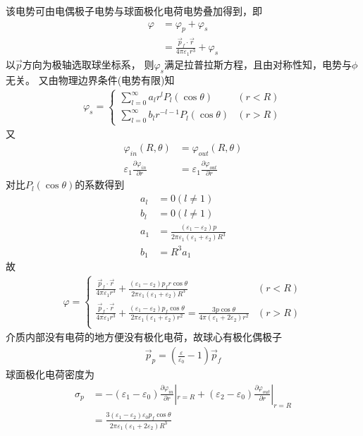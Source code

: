 \documentclass{phyasgn}
\begin{document}
\begin{sol}[3]
  该电势可由电偶极子电势与球面极化电荷电势叠加得到，即
  \begin{align*}
    \varphi&=\varphi_p+\varphi_s\\
    &=\frac{\vec{p}_f\cdot\vec{r}}{4\pi\varepsilon_1r^3}+\varphi_s
  \end{align*}
  以$\vec{p}$方向为极轴选取球坐标系，
  则$\varphi_s$满足拉普拉斯方程，且由对称性知，电势与$\phi$无关。
  又由物理边界条件(电势有限)知
  \begin{align*}
    \varphi_s=\left\{\begin{matrix}
      \sum_{l=0}^{\infty}a_lr^lP_l(\cos\theta)&(r<R)\\
      \sum_{l=0}^{\infty}b_lr^{-l-1}P_l(\cos\theta)&(r>R)
    \end{matrix}\right.
  \end{align*}
  又
  \begin{align*}
    \varphi_{in}(R,\theta)&=\varphi_{out}(R,\theta)\\
    \varepsilon_1\frac{\partial \varphi_{in}}{\partial r}&=\varepsilon_1\frac{\partial \varphi_{out}}{\partial r}
  \end{align*}
  对比$P_l(\cos\theta)$的系数得到
  \begin{align*}
    a_l&=0(l\neq1)\\
    b_l&=0(l\neq1)\\
    a_1&=\frac{(\varepsilon_1-\varepsilon_2)p}{2\pi\varepsilon_1(\varepsilon_1+\varepsilon_2)R^3}\\
    b_1&=R^3a_1
  \end{align*}
  故
  \begin{align*}
    \varphi=\left\{\begin{matrix}
      \frac{\vec{p}_f\cdot\vec{r}}{4\pi\varepsilon_1r^3}+\frac{(\varepsilon_1-\varepsilon_2)p_fr\cos\theta}{2\pi\varepsilon_1(\varepsilon_1+\varepsilon_2)R^3}&(r<R)\\
      \frac{\vec{p}_f\cdot\vec{r}}{4\pi\varepsilon_1r^3}+\frac{(\varepsilon_1-\varepsilon_2)p_f\cos\theta}{2\pi\varepsilon_1(\varepsilon_1+\varepsilon_2)r^2}=\frac{3p\cos\theta}{4\pi(\varepsilon_1+2\varepsilon_2)r^2}&(r>R)\\
    \end{matrix}\right.
  \end{align*}
  介质内部没有电荷的地方便没有极化电荷，故球心有极化偶极子
  \begin{align*}
    \vec{p}_p=(\frac{\varepsilon}{\varepsilon_0}-1)\vec{p}_f
  \end{align*}
  球面极化电荷密度为
  \begin{align*}
    \sigma_p&=-(\varepsilon_1-\varepsilon_0)\frac{\partial \varphi_{in}}{\partial r}|_{r=R}+(\varepsilon_2-\varepsilon_0)\frac{\partial \varphi_{out}}{\partial r}|_{r=R}\\
    &=\frac{3(\varepsilon_1-\varepsilon_2)\varepsilon_0p_f\cos\theta}{2\pi\varepsilon_1(\varepsilon_1+2\varepsilon_2)R^3}
  \end{align*}
\end{sol} 
\end{document}
